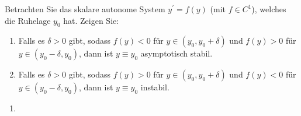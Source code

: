 \begin{exercise}
Betrachten Sie das skalare autonome System $y^{\prime} = f(y)$ (mit $f \in C^1$),
welches die Ruhelage $y_0$ hat. Zeigen Sie:
\begin{enumerate}[label = \textbf{\alph*)}]
  \item Falls es $\delta > 0$ gibt, sodass $f(y) < 0$ für $y \in (y_0,y_0 + \delta)$
und $f(y) > 0$ für $y \in (y_0 - \delta, y_0)$, dann ist $y \equiv y_0$
asymptotisch stabil.
\item Falls es $\delta > 0$ gibt, sodass $f(y) > 0$ für $y \in (y_0,y_0 + \delta)$
und $f(y) < 0$ für $y \in (y_0 - \delta, y_0)$, dann ist $y \equiv y_0$ instabil.
\end{enumerate}
\end{exercise}
\begin{solution}
  \phantom{}
\begin{enumerate}[label = \textbf{\alph*)}]
\item
\end{enumerate}
\end{solution}
